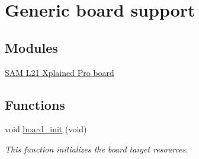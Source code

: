 \hypertarget{group__group__common__boards}{}\section{Generic board support}
\label{group__group__common__boards}
\subsection*{Modules}
\begin{DoxyCompactItemize}
\item 
\hyperlink{group__saml21__xplained__pro__group}{S\+A\+M L21 Xplained Pro board}
\end{DoxyCompactItemize}
\subsection*{Functions}
\begin{DoxyCompactItemize}
\item 
void \hyperlink{group__group__common__boards_ga916f2adc2080b4fe88034086d107a8dc}{board\+\_\+init} (void)
\begin{DoxyCompactList}\small\item\em This function initializes the board target resources. \end{DoxyCompactList}\end{DoxyCompactItemize}
